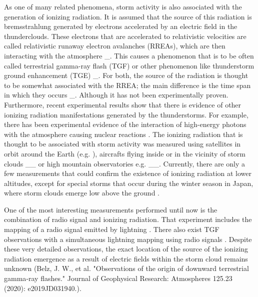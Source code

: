 As one of many related phenomena, storm activity is also associated with the generation of ionizing radiation. It is assumed that the source of this radiation is bremsstrahlung generated by electrons accelerated by an electric field in the thunderclouds. These electrons that are accelerated to relativistic velocities are called relativistic runaway electron avalanches (RREAs), which are then interacting with the atmosphere \cite{Dwyer_2003}_\cite{Gurevich_Milikh_Roussel-Dupre_1992}. This causes a phenomenon that is to be often called terrestrial gamma-ray flash (TGF) \cite{Fishman_Bhat_Mallozzi_Horack_Koshut_Kouveliotou_Pendleton_Meegan_Wilson_Paciesas_et al._1994} or other phenomenon like thunderstorm ground enhancement (TGE) \cite{Chilingarian_2013}_\cite{Torii_Takeishi_Hosono_2002}. For both, the source of the radiation is thought to be somewhat associated with the RREA; the main difference is the time span in which they occurs \cite{Dwyer_2003}_\cite{Gurevich_Milikh_Roussel-Dupre_1992}. Although it has not been experimentally proven. Furthermore, recent experimental results show that there is evidence of other ionizing radiation manifestations generated by the thunderstorms. For example, there has been experimental evidence of the interaction of high-energy photons with the atmosphere causing nuclear reactions \cite{Enoto_Wada_Furuta_Nakazawa_Yuasa_Okuda_Makishima_Sato_Sato_Nakano_et al._2017}. 
The ionizing radiation that is thought to be associated with storm activity was measured using satellites in orbit around the Earth (e.g. \cite{Østgaard_Neubert_Reglero_Ullaland_Yang_Genov_Marisaldi_Mezentsev_Kochkin_Lehtinen_et al._2019} ), aircrafts flying inside or in the vicinity of storm clouds \cite{Kochkin_van Deursen_Marisaldi_Ursi_de Boer_Bardet_Allasia_Boissin_Flourens_Østgaard_2017}_\cite{McCarthy_Parks_1985}_\cite{Parks_Mauk_Spiger_Chin_1981} or high mountain observatories e.g. \cite{Chilingarian_Hovsepyan_Hovhannisyan_2011}_\cite{Chum_Langer_Baše_Kollárik_Strhárský_Diendorfer_Rusz_2020}_\cite{Tsuchiya_Enoto_Torii_Nakazawa_Yuasa_Torii_Fukuyama_Yamaguchi_Kato_Okano_et al._2009}. Currently, there are only a few measurements that could confirm the existence of ionizing radiation at lower altitudes, except for special storms that occur during the winter season in Japan, where storm clouds emerge low above the ground \cite{Michimoto_2007}.

One of the most interesting measurements performed until now is the combination of radio signal and ionizing radiation. That experiment includes the mapping of a radio signal emitted by lightning \cite{Rison_Thomas_Krehbiel_Hamlin_Harlin_1999} \cite{Wu_Wang_Takagi_2018}.
There also exist TGF observations with a simultaneous lightning mapping using radio signals \cite{Abbasi_Abu-Zayyad_Allen_Barcikowski_Belz_Bergman_Blake_Byrne_Cady_Cheon_et al._2018}. Despite these very detailed observations, the exact location of the source of the ionizing radiation emergence as a result of electric fields within the storm cloud remains unknown (Belz, J. W., et al. "Observations of the origin of downward terrestrial gamma‐ray flashes." Journal of Geophysical Research: Atmospheres 125.23 (2020): e2019JD031940.). 

